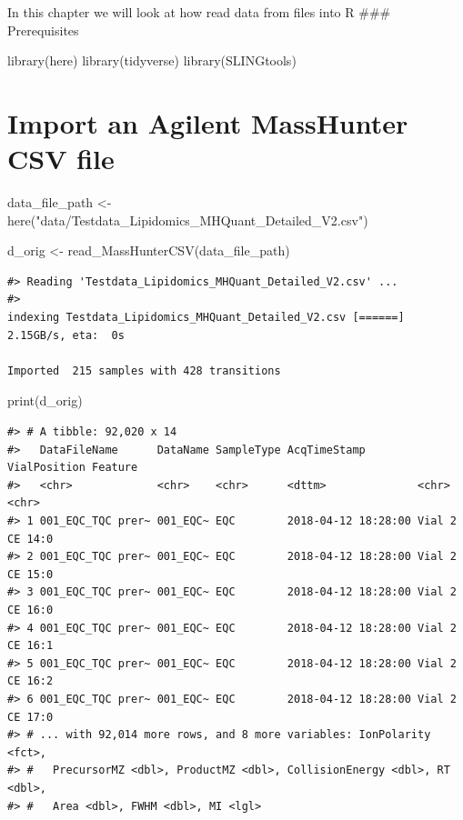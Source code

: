 \documentclass[
  letterpaper,
  DIV=11,
  numbers=noendperiod]{scrreprt}
\newenvironment{Shaded}{\begin{snugshade}}{\end{snugshade}}
\newcommand{\FunctionTok}[1]{\textcolor[rgb]{0.28,0.35,0.67}{#1}}
\newcommand{\NormalTok}[1]{\textcolor[rgb]{0.00,0.23,0.31}{#1}}
\newcommand{\OtherTok}[1]{\textcolor[rgb]{0.00,0.23,0.31}{#1}}
\newcommand{\StringTok}[1]{\textcolor[rgb]{0.13,0.47,0.30}{#1}}
\begin{document}
In this chapter we will look at how read data from files into R \#\#\#
Prerequisites

\begin{Shaded}
\begin{Highlighting}[]
\FunctionTok{library}\NormalTok{(here)}
\FunctionTok{library}\NormalTok{(tidyverse)}
\FunctionTok{library}\NormalTok{(SLINGtools)}
\end{Highlighting}
\end{Shaded}

\hypertarget{import-an-agilent-masshunter-csv-file}{%
\section{Import an Agilent MassHunter CSV
file}\label{import-an-agilent-masshunter-csv-file}}

\begin{Shaded}
\begin{Highlighting}[]
\NormalTok{data\_file\_path }\OtherTok{\textless{}{-}} \FunctionTok{here}\NormalTok{(}\StringTok{"data/Testdata\_Lipidomics\_MHQuant\_Detailed\_V2.csv"}\NormalTok{)}

\NormalTok{d\_orig }\OtherTok{\textless{}{-}} \FunctionTok{read\_MassHunterCSV}\NormalTok{(data\_file\_path)}
\end{Highlighting}
\end{Shaded}

\begin{verbatim}
#> Reading 'Testdata_Lipidomics_MHQuant_Detailed_V2.csv' ... 
#> 
indexing Testdata_Lipidomics_MHQuant_Detailed_V2.csv [======] 2.15GB/s, eta:  0s
                                                                                
Imported  215 samples with 428 transitions
\end{verbatim}

\begin{Shaded}
\begin{Highlighting}[]
\FunctionTok{print}\NormalTok{(d\_orig)}
\end{Highlighting}
\end{Shaded}

\begin{verbatim}
#> # A tibble: 92,020 x 14
#>   DataFileName      DataName SampleType AcqTimeStamp        VialPosition Feature
#>   <chr>             <chr>    <chr>      <dttm>              <chr>        <chr>  
#> 1 001_EQC_TQC prer~ 001_EQC~ EQC        2018-04-12 18:28:00 Vial 2       CE 14:0
#> 2 001_EQC_TQC prer~ 001_EQC~ EQC        2018-04-12 18:28:00 Vial 2       CE 15:0
#> 3 001_EQC_TQC prer~ 001_EQC~ EQC        2018-04-12 18:28:00 Vial 2       CE 16:0
#> 4 001_EQC_TQC prer~ 001_EQC~ EQC        2018-04-12 18:28:00 Vial 2       CE 16:1
#> 5 001_EQC_TQC prer~ 001_EQC~ EQC        2018-04-12 18:28:00 Vial 2       CE 16:2
#> 6 001_EQC_TQC prer~ 001_EQC~ EQC        2018-04-12 18:28:00 Vial 2       CE 17:0
#> # ... with 92,014 more rows, and 8 more variables: IonPolarity <fct>,
#> #   PrecursorMZ <dbl>, ProductMZ <dbl>, CollisionEnergy <dbl>, RT <dbl>,
#> #   Area <dbl>, FWHM <dbl>, MI <lgl>
\end{verbatim}
\end{document}
